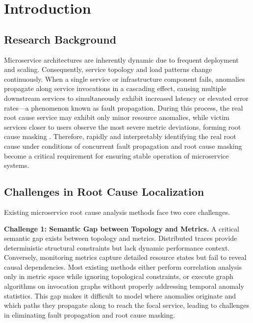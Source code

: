 \documentclass[conference]{IEEEtran}
\begin{document}
\section{Introduction}

\subsection{Research Background}

Microservice architectures are inherently dynamic due to frequent deployment and scaling. Consequently, service topology and load patterns change continuously. When a single service or infrastructure component fails, anomalies propagate along service invocations in a cascading effect, causing multiple downstream services to simultaneously exhibit increased latency or elevated error rates—a phenomenon known as fault propagation. During this process, the real root cause service may exhibit only minor resource anomalies, while victim services closer to users observe the most severe metric deviations, forming root cause masking \cite{dynacausal}. Therefore, rapidly and interpretably identifying the real root cause under conditions of concurrent fault propagation and root cause masking become a critical requirement for ensuring stable operation of microservice systems.

\subsection{Challenges in Root Cause Localization}

Existing microservice root cause analysis methods face two core challenges.

\textbf{Challenge 1: Semantic Gap between Topology and Metrics.} A critical semantic gap exists between topology and metrics. Distributed traces provide deterministic structural constraints but lack dynamic performance context. Conversely, monitoring metrics capture detailed resource states but fail to reveal causal dependencies. Most existing methods either perform correlation analysis only in metric space while ignoring topological constraints, or execute graph algorithms on invocation graphs without properly addressing temporal anomaly statistics. This gap makes it difficult to model where anomalies originate and which paths they propagate along to reach the focal service, leading to challenges in eliminating fault propagation and root cause masking.
\end{document}
